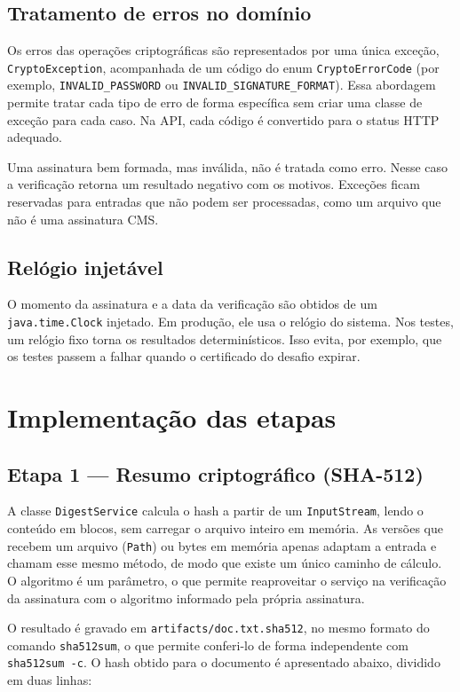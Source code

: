 \documentclass[12pt,a4paper]{article}
\begin{document}
\subsection{Tratamento de erros no domínio}

Os erros das operações criptográficas são representados por uma única exceção, \texttt{CryptoException}, acompanhada de um código do enum \texttt{CryptoErrorCode} (por exemplo, \texttt{INVALID\_PASSWORD} ou \texttt{INVALID\_SIGNATURE\_FORMAT}). Essa abordagem permite tratar cada tipo de erro de forma específica sem criar uma classe de exceção para cada caso. Na API, cada código é convertido para o status HTTP adequado.

Uma assinatura bem formada, mas inválida, não é tratada como erro. Nesse caso a verificação retorna um resultado negativo com os motivos. Exceções ficam reservadas para entradas que não podem ser processadas, como um arquivo que não é uma assinatura CMS.

\subsection{Relógio injetável}

O momento da assinatura e a data da verificação são obtidos de um \texttt{java.time.Clock} injetado. Em produção, ele usa o relógio do sistema. Nos testes, um relógio fixo torna os resultados determinísticos. Isso evita, por exemplo, que os testes passem a falhar quando o certificado do desafio expirar.

\section{Implementação das etapas}

\subsection{Etapa 1 --- Resumo criptográfico (SHA-512)}

A classe \texttt{DigestService} calcula o hash a partir de um \texttt{InputStream}, lendo o conteúdo em blocos, sem carregar o arquivo inteiro em memória. As versões que recebem um arquivo (\texttt{Path}) ou bytes em memória apenas adaptam a entrada e chamam esse mesmo método, de modo que existe um único caminho de cálculo. O algoritmo é um parâmetro, o que permite reaproveitar o serviço na verificação da assinatura com o algoritmo informado pela própria assinatura.

O resultado é gravado em \texttt{artifacts/doc.txt.sha512}, no mesmo formato do comando \texttt{sha512sum}, o que permite conferi-lo de forma independente com \texttt{sha512sum -c}. O hash obtido para o documento é apresentado abaixo, dividido em duas linhas:
\end{document}
